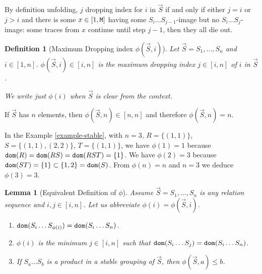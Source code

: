 \documentclass{lmcs}
\newtheorem{lemma}[theorem]{Lemma}
\newtheorem{definition}[theorem]{Definition}
\begin{document}
By definition unfolding, $j$ dropping index for $i$ in $\vec{S}$
if and only if either $j=i$ or $j>i$ and there is some $x \in [1,{\tt M}]$ having some 
$S_i \ldots S_{j-1}$-image  but no $S_i \ldots S_j$-image: 
some traces from $x$ continue until step $j-1$, then they all die out. 


\begin{definition}[Maximum Dropping index $\phi(\vec{S},i)$]
Let $\vec{S} = S_1, \ldots, S_n$ and $i \in [1,n]$.
$\phi(\vec{S},i) \in [i,n]$ is the maximum dropping index $j\in [i,n]$ 
of $i$ in $\vec{S}$. 

We write just $\phi(i)$ when $\vec{S}$ is clear from the context. 
\end{definition}

If $\vec{S}$ has $n$ elements, then $\phi(\vec{S},n) \in [n,n]$ and therefore
$\phi(\vec{S},n)=n$.

In the Example \ref{example-stable}, with  $n=3$, $R=\{(1,1)\}$, $S=\{(1,1),(2,2)\}$, 
$T=\{(1,1)\}$, we have $\phi(1)=1$ because ${\tt dom}(R) = {\tt dom}(RS) = {\tt dom}(RST) =  \{1\}$.
We have $\phi(2)=3$ because ${\tt dom}(ST) = \{1\} \subset \{1,2\} = {\tt dom}(S)$. 
From $\phi(n)=n$ and $n=3$ we deduce $\phi(3)=3$.

\begin{lemma}[Equivalent Definition of $\phi$]
\label{lemma-equivalent-phi}
Assume $\vec{S} = S_1, \ldots, S_n$ is any relation sequence and $i,j \in [i,n]$.
Let us abbreviate $\phi(i) = \phi(\vec{S},i)$.

\begin{enumerate}
\item
\label{lemma-equivalent-phi-01}
${\tt dom}(S_i \ldots S_{\phi(i)}) = {\tt dom}(S_i \ldots S_n)$.

\item
\label{lemma-equivalent-phi-02}
$\phi(i)$ is the minimum $j \in [i,n]$ such that
${\tt dom}(S_i \ldots S_j) = {\tt dom}(S_i \ldots S_n)$.

\item
\label{lemma-equivalent-phi-03}
If $S_a \ldots S_b$ is a product in a stable grouping of $\vec{S}$, then 
$\phi(\vec{S},a) \le b$.

\end{enumerate}

\end{lemma}
\end{document}
